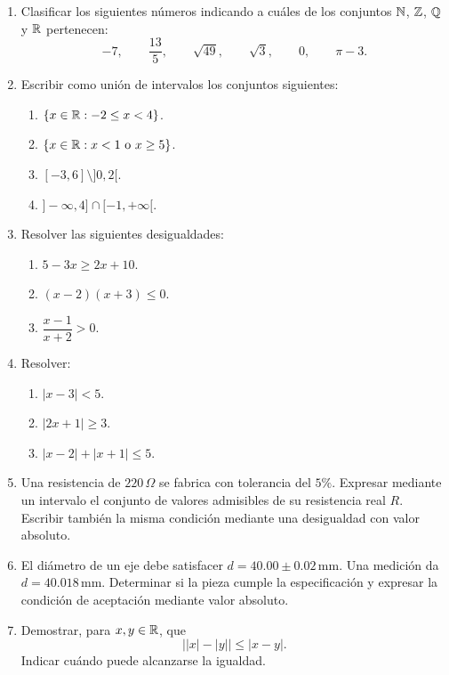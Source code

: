 \begin{enumerate}[label=\textbf{\arabic*.},leftmargin=*]

\item Clasificar los siguientes números indicando a cuáles de los conjuntos \(\mathbb{N}\), \(\mathbb{Z}\), \(\mathbb{Q}\) y \(\mathbb{R}\) pertenecen:
\[
-7,\qquad \frac{13}{5},\qquad \sqrt{49},\qquad \sqrt3,\qquad 0,\qquad \pi-3.
\]

\item Escribir como unión de intervalos los conjuntos siguientes:
\begin{enumerate}[label=\alph*)]
\item \(\{x\in\mathbb{R}:-2\leq x<4\}\).
\item \(\{x\in\mathbb{R}:x<1\text{ o }x\geq5\}\).
\item \([-3,6]\setminus]0,2[\).
\item \(]-\infty,4]\cap[-1,+\infty[\).
\end{enumerate}

\item Resolver las siguientes desigualdades:
\begin{enumerate}[label=\alph*)]
\item \(5-3x\geq2x+10\).
\item \((x-2)(x+3)\leq0\).
\item \(\dfrac{x-1}{x+2}>0\).
\end{enumerate}

\item Resolver:
\begin{enumerate}[label=\alph*)]
\item \(|x-3|<5\).
\item \(|2x+1|\geq3\).
\item \(|x-2|+|x+1|\leq5\).
\end{enumerate}

\item Una resistencia de \(220\,\Omega\) se fabrica con tolerancia del \(5\%\). Expresar mediante un intervalo el conjunto de valores admisibles de su resistencia real \(R\). Escribir también la misma condición mediante una desigualdad con valor absoluto.

\item El diámetro de un eje debe satisfacer \(d=40.00\pm0.02\,\mathrm{mm}\). Una medición da \(d=40.018\,\mathrm{mm}\). Determinar si la pieza cumple la especificación y expresar la condición de aceptación mediante valor absoluto.

\item Demostrar, para \(x,y\in\mathbb{R}\), que
\[
\bigl||x|-|y|\bigr|\leq|x-y|.
\]
Indicar cuándo puede alcanzarse la igualdad.


\end{enumerate}
